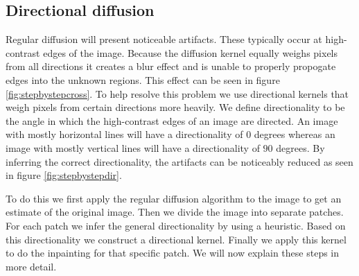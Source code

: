 \subsection{Directional diffusion}

Regular diffusion will present noticeable artifacts. These typically occur at high-contrast edges of the image. Because the diffusion kernel equally weighs pixels from all directions it creates a blur effect and is unable to properly propogate edges into the unknown regions. This effect can be seen in figure \ref{fig:stepbystepcross}. To help resolve this problem we use directional kernels that weigh pixels from certain directions more heavily. We define directionality to be the angle in which the high-contrast edges of an image are directed. An image with mostly horizontal lines will have a directionality of $0$ degrees whereas an image with mostly vertical lines will have a directionality of $90$ degrees. By inferring the correct directionality, the artifacts can be noticeably reduced as seen in figure \ref{fig:stepbystepdir}.

To do this we first apply the regular diffusion algorithm to the image to get an estimate of the original image. Then we divide the image into separate patches. For each patch we infer the general directionality by using a heuristic. Based on this directionality we construct a directional kernel. Finally we apply this kernel to do the inpainting for that specific patch. We will now explain these steps in more detail.

